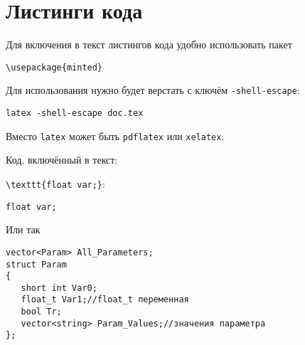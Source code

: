 \chapter{Листинги кода}\label{ch:code}

Для включения в текст листингов кода удобно использовать пакет

\verb|\usepackage{minted}|

Для использования нужно будет верстать с ключём \texttt{-shell-escape}:
\begin{verbatim}
latex -shell-escape doc.tex
\end{verbatim}

Вместо \texttt{latex} может быть \texttt{pdflatex} или \texttt{xelatex}.

Код, включённый в текст: 

\verb|\texttt{float var;}|:

 \texttt{float var;} 

Или так

\begin{verbatim}
vector<Param> All_Parameters;
struct Param
{
   short int Var0;
   float_t Var1;//float_t переменная 
   bool Tr;
   vector<string> Param_Values;//значения параметра
};
\end{verbatim}

